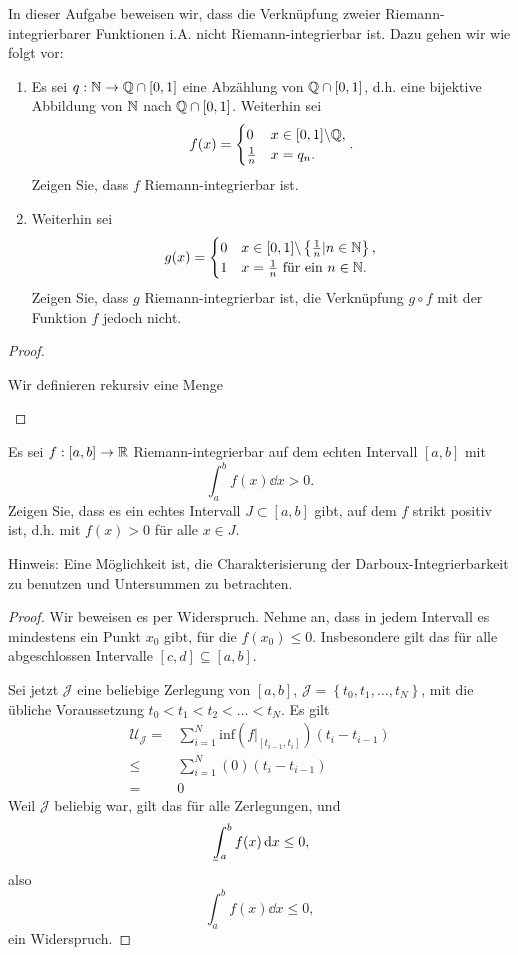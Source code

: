 \begin{Problem}
	In dieser Aufgabe beweisen wir, dass die Verknüpfung zweier Riemann-integrierbarer Funktionen i.A. nicht Riemann-integrierbar ist. Dazu gehen wir wie folgt vor:
	\begin{enumerate}[label=(\alph*)]
		\item Es sei $q:\mathbb{N} \to \mathbb{Q}\cap [0,1]$ eine Abzählung von $\mathbb{Q}\cap [0,1]$, d.h. eine bijektive Abbildung von $\mathbb{N}$ nach $\mathbb{Q}\cap [0,1]$. Weiterhin sei
			 \[
			f(x)=\begin{cases}
				0 & x\in [0,1]\backslash \mathbb{Q}, \\
				\frac{1}{n} & x=q_n.
			\end{cases}
			.\] 
			Zeigen Sie, dass $f$ Riemann-integrierbar ist.
		\item Weiterhin sei
			\[
			g(x)=\begin{cases}
				0 & x\in [0,1]\backslash \left\{ \frac{1}{n}|n\in \mathbb{N} \right\},\\
				1 & x=\frac{1}{n}\text{ f\"{u}r ein }n\in \mathbb{N}.
			\end{cases}
			\] 
			Zeigen Sie, dass $g$ Riemann-integrierbar ist, die Verknüpfung $g\circ f$ mit der Funktion $f$ jedoch nicht. 
	\end{enumerate}
\end{Problem}
\begin{proof}
	\begin{parts}
	\item Wir definieren rekursiv eine Menge
	\end{parts}
\end{proof}
\begin{Problem}
	Es sei $f:[a,b]\to \mathbb{R}$ Riemann-integrierbar auf dem echten Intervall $[a,b]$ mit
	\[
		\int_a^b f(x)\dd{x}>0
	.\] 
	Zeigen Sie, dass es ein echtes Intervall $J\subset [a,b]$ gibt, auf dem $f$ strikt positiv ist, d.h. mit $f(x)>0$ f\"{u}r alle $x\in J$.

	{\footnotesize Hinweis: Eine Möglichkeit ist, die Charakterisierung der Darboux-Integrierbarkeit zu benutzen und Untersummen zu betrachten.}
\end{Problem}
\begin{proof}
	Wir beweisen es per Widerspruch. Nehme an, dass in jedem Intervall es mindestens ein Punkt $x_0$ gibt, f\"{u}r die $f(x_0)\le 0$. Insbesondere gilt das f\"{u}r alle abgeschlossen Intervalle $[c,d]\subseteq [a,b]$.

	Sei jetzt $\mathcal{J}$ eine beliebige Zerlegung von $[a,b]$, $\mathcal{J}=\left\{ t_0,t_1,\dots,t_N \right\} $, mit die übliche Voraussetzung $t_0< t_1 < t_2<\dots< t_N$. Es gilt
	\begin{align*}
		\mathcal{U}_{\mathcal{J}}=&\sum_{i=1}^{N} \text{inf}\left( f|_{[t_{i-1},t_i]} \right) (t_i-t_{i-1})\\
		\le& \sum_{i=1}^{N} (0)(t_i-t_{i-1})\\
		=& 0
	\end{align*}
	Weil $\mathcal{J}$ beliebig war, gilt das f\"{u}r alle Zerlegungen, und
	\[
		\mkern3mu\underline{\vphantom{\intop}\mkern7mu}\mkern-10mu\int_a^b f(x)\dd{x}\le 0
	,\]
	also
	\[
		\int_a^b f(x)\dd{x}\le 0
	,\] 
	ein Widerspruch.
\end{proof}
